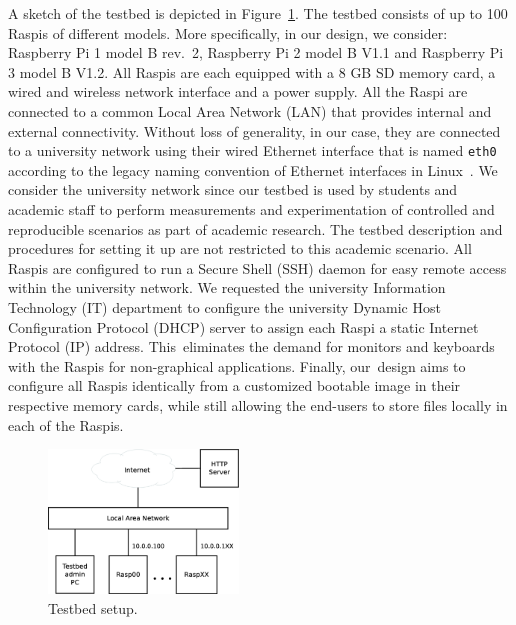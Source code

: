 \documentclass[electronics,article,accept,moreauthors,pdftex,10pt,a4paper]{mdpi}
\theoremstyle{mdpi}
\newcounter{ex}
\newcounter{re}
\theoremstyle{mdpidefinition}
\begin{document}
A sketch of the testbed is depicted in Figure~\ref{fig:testbed_setup}.
The testbed consists of up to 100 Raspis of different models.
More specifically, in our design, we consider: Raspberry Pi 1 model B rev.~2,
Raspberry Pi 2 model B V1.1 and Raspberry Pi 3 model B V1.2.
All Raspis are each equipped with a 8 GB \ac{SD} memory card, a wired and wireless
network interface and a power supply. All the Raspi are connected to
a common Local Area Network (LAN) that provides internal and external connectivity. Without
loss of generality, in our case, they are connected to a university network
using their wired Ethernet interface that is named \texttt{eth0} according
to the legacy naming convention of Ethernet interfaces in
Linux~\cite{PredictableNetworkInterfaceNames}. We consider the
university network since our testbed is used by students and academic staff
to perform measurements and experimentation of controlled and
reproducible scenarios as part of academic research. The
testbed description and procedures for setting it up are not restricted
to this academic scenario. All Raspis are configured to run
a Secure Shell (SSH) daemon for easy remote access within the university network.
We requested the university Information Technology (IT) department to configure the university Dynamic Host Configuration Protocol (DHCP) server to assign each Raspi a static Internet Protocol (IP) address. This~eliminates the demand for monitors and keyboards with the Raspis
for non-graphical applications. Finally, our~design aims to configure all
Raspis identically from a customized bootable image in their
respective memory cards, while still allowing the end-users to store
files locally in each of the Raspis.

\begin{figure}[ht!]
\centering
\includegraphics[width=0.45\textwidth]{testbed_setup3.eps}
\caption{Testbed setup.}
\label{fig:testbed_setup}
\end{figure}

\end{document}
